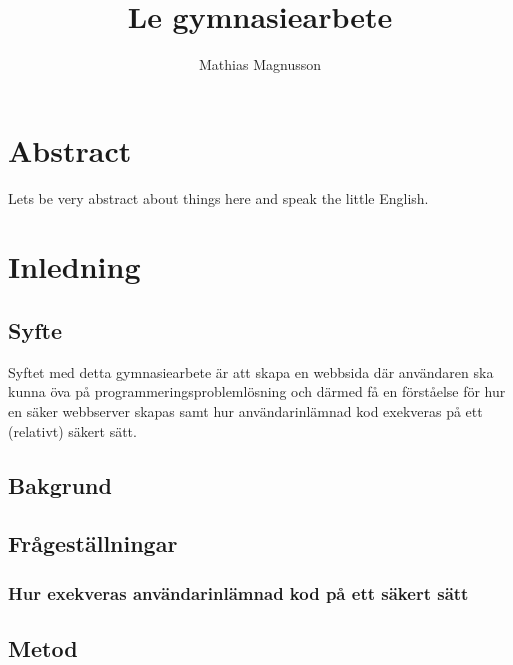 \documentclass{article}
\author{Mathias Magnusson}
\title{Le gymnasiearbete}
\date{}
\begin{document}
\maketitle{}

\section*{Abstract}

Lets be very abstract about things here and speak the little English.

\clearpage

\tableofcontents

\clearpage

\section{Inledning}

\subsection{Syfte}

Syftet med detta gymnasiearbete är att skapa en webbsida där användaren ska
kunna öva på programmeringsproblemlösning och därmed få en förståelse för hur
en säker webbserver skapas samt hur användarinlämnad kod exekveras på ett
(relativt) säkert sätt.

\subsection{Bakgrund}

\subsection{Frågeställningar}

\subsubsection{Hur exekveras användarinlämnad kod på ett säkert sätt}

\subsubsection{}

\subsection{Metod}
\end{document}
